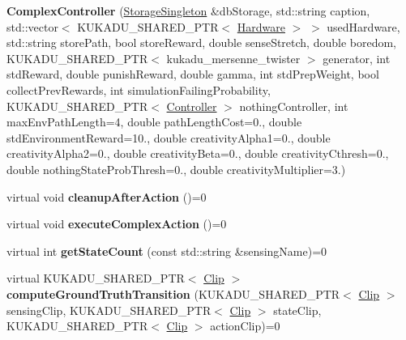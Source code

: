 \begin{DoxyCompactItemize}
\item 
{\bfseries Complex\+Controller} (\hyperlink{classkukadu_1_1StorageSingleton}{Storage\+Singleton} \&db\+Storage, std\+::string caption, std\+::vector$<$ K\+U\+K\+A\+D\+U\+\_\+\+S\+H\+A\+R\+E\+D\+\_\+\+P\+TR$<$ \hyperlink{classkukadu_1_1Hardware}{Hardware} $>$ $>$ used\+Hardware, std\+::string store\+Path, bool store\+Reward, double sense\+Stretch, double boredom, K\+U\+K\+A\+D\+U\+\_\+\+S\+H\+A\+R\+E\+D\+\_\+\+P\+TR$<$ kukadu\+\_\+mersenne\+\_\+twister $>$ generator, int std\+Reward, double punish\+Reward, double gamma, int std\+Prep\+Weight, bool collect\+Prev\+Rewards, int simulation\+Failing\+Probability, K\+U\+K\+A\+D\+U\+\_\+\+S\+H\+A\+R\+E\+D\+\_\+\+P\+TR$<$ \hyperlink{classkukadu_1_1Controller}{Controller} $>$ nothing\+Controller, int max\+Env\+Path\+Length=4, double path\+Length\+Cost=0., double std\+Environment\+Reward=10., double creativity\+Alpha1=0., double creativity\+Alpha2=0., double creativity\+Beta=0., double creativity\+Cthresh=0., double nothing\+State\+Prob\+Thresh=0., double creativity\+Multiplier=3.)\hypertarget{classkukadu_1_1ComplexController_abb7bd8b2f8eb8091762a05de3a6b0db0}{}\label{classkukadu_1_1ComplexController_abb7bd8b2f8eb8091762a05de3a6b0db0}

\item 
virtual void {\bfseries cleanup\+After\+Action} ()=0\hypertarget{classkukadu_1_1ComplexController_af43a1a1724f8eb2d37fbc65c785eca93}{}\label{classkukadu_1_1ComplexController_af43a1a1724f8eb2d37fbc65c785eca93}

\item 
virtual void {\bfseries execute\+Complex\+Action} ()=0\hypertarget{classkukadu_1_1ComplexController_a246a72860c5c317173d1f212ac7a25b3}{}\label{classkukadu_1_1ComplexController_a246a72860c5c317173d1f212ac7a25b3}

\item 
virtual int {\bfseries get\+State\+Count} (const std\+::string \&sensing\+Name)=0\hypertarget{classkukadu_1_1ComplexController_ab627bd4d320f64646a09acbc5f1a3a8a}{}\label{classkukadu_1_1ComplexController_ab627bd4d320f64646a09acbc5f1a3a8a}

\item 
virtual K\+U\+K\+A\+D\+U\+\_\+\+S\+H\+A\+R\+E\+D\+\_\+\+P\+TR$<$ \hyperlink{classkukadu_1_1Clip}{Clip} $>$ {\bfseries compute\+Ground\+Truth\+Transition} (K\+U\+K\+A\+D\+U\+\_\+\+S\+H\+A\+R\+E\+D\+\_\+\+P\+TR$<$ \hyperlink{classkukadu_1_1Clip}{Clip} $>$ sensing\+Clip, K\+U\+K\+A\+D\+U\+\_\+\+S\+H\+A\+R\+E\+D\+\_\+\+P\+TR$<$ \hyperlink{classkukadu_1_1Clip}{Clip} $>$ state\+Clip, K\+U\+K\+A\+D\+U\+\_\+\+S\+H\+A\+R\+E\+D\+\_\+\+P\+TR$<$ \hyperlink{classkukadu_1_1Clip}{Clip} $>$ action\+Clip)=0\hypertarget{classkukadu_1_1ComplexController_a5b8c6fcde91e49e365ada1793f029170}{}\label{classkukadu_1_1ComplexController_a5b8c6fcde91e49e365ada1793f029170}


\end{DoxyCompactItemize}
